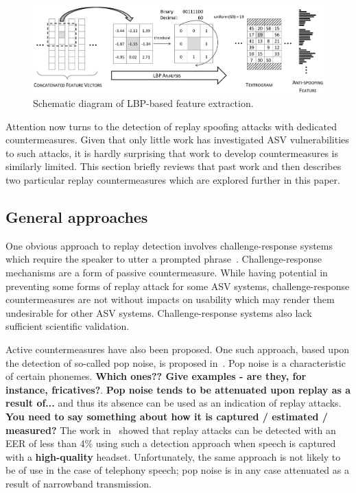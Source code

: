 \begin{figure}
	\includegraphics[width=1\linewidth]{Figs/LBP_idea.png}
	\caption{Schematic diagram of LBP-based feature extraction.}
	\label{fig:LBPfeature}
\end{figure}

Attention now turns to the detection of replay spoofing attacks with dedicated countermeasures.  Given that only little work has investigated ASV vulnerabilities to such attacks, it is hardly surprising that work to develop countermeasures is similarly limited.  This section briefly reviews that past work and then describes two particular replay countermeasures which are explored further in this paper.



\subsection{General approaches}

One obvious approach to replay detection involves challenge-response systems which require the speaker to utter a prompted phrase~\cite{Petrovska1998}. 
Challenge-response mechanisms are a form of passive countermeasure.
While having potential in preventing some forms of replay attack for some ASV systems, challenge-response countermeasures are not without impacts on usability which may render them undesirable for other ASV systems.  Challenge-response systems also lack sufficient scientific validation.

Active countermeasures have also been proposed.
One such approach, based upon the detection of so-called pop noise, is proposed in~\cite{Shiota2015}.  Pop noise is a characteristic of certain phonemes.  {\bfseries Which ones??  Give examples - are they, for instance, fricatives?}.  {\bfseries Pop noise tends to be attenuated upon replay as a result of...} and thus its absence can be used as an indication of replay attacks.  {\bfseries You need to say something about how it is captured / estimated / measured?}  The work in~\cite{Shiota2015} showed that replay attacks can be detected with an EER of less than 4\% using such a detection approach when speech is captured with a {\bfseries high-quality} headset.  Unfortunately, the same approach is not likely to be of use in the case of telephony speech; pop noise is in any case attenuated as a result of narrowband transmission.

